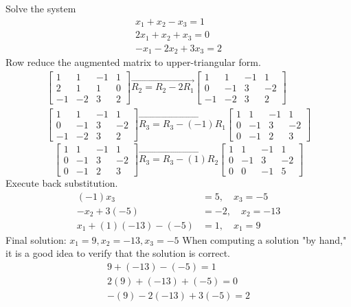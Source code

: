 \documentclass[../main.tex]{subfiles}
\begin{document}
\begin{example} Solve the system
$$
\begin{array}{r}
x_{1}+x_{2}-x_{3}=1 \\
2 x_{1}+x_{2}+x_{3}=0 \\
-x_{1}-2 x_{2}+3 x_{3}=2
\end{array}
$$
Row reduce the augmented matrix to upper-triangular form.
$$
\begin{array}{l}
{\left[\begin{array}{ccc|c}
	1 & 1 & -1 & 1 \\
	2 & 1 & 1 & 0 \\
	-1 & -2 & 3 & 2
	\end{array}\right] \overrightarrow{R_{2}=R_{2}-2 R_{1}}\left[\begin{array}{ccc|c}
	1 & 1 & -1 & 1 \\
	0 & -1 & 3 & -2 \\
	-1 & -2 & 3 & 2
	\end{array}\right]} \\
{\left[\begin{array}{ccc|c}
	1 & 1 & -1 & 1 \\
	0 & -1 & 3 & -2 \\
	-1 & -2 & 3 & 2
	\end{array}\right] \overrightarrow{R_{3}=R_{3}-(-1) R_{1}}\left[\begin{array}{ccc|c}
	1 & 1 & -1 & 1 \\
	0 & -1 & 3 & -2 \\
	0 & -1 & 2 & 3
	\end{array}\right]}
\end{array}
$$
$$
\left[\begin{array}{ccc|c}
1 & 1 & -1 & 1 \\
0 & -1 & 3 & -2 \\
0 & -1 & 2 & 3
\end{array}\right] \overrightarrow{R_{3}=R_{3}-(1) R_{2}}\left[\begin{array}{ccc|c}
1 & 1 & -1 & 1 \\
0 & -1 & 3 & -2 \\
0 & 0 & -1 & 5
\end{array}\right]
$$
Execute back substitution.
$$
\begin{aligned}
(-1) x_{3} &=5, \quad x_{3}=-5 \\
-x_{2}+3(-5) &=-2, \quad x_{2}=-13 \\
x_{1}+(1)(-13)-(-5) &=1, \quad x_{1}=9
\end{aligned}
$$
Final solution: $x_{1}=9, x_{2}=-13, x_{3}=-5$ When computing a solution "by hand," it is a good idea to verify that the solution is correct.
$$
\begin{array}{r}
9+(-13)-(-5)=1 \\
2(9)+(-13)+(-5)=0 \\
-(9)-2(-13)+3(-5)=2
\end{array}
$$
\end{example}
\end{document}
